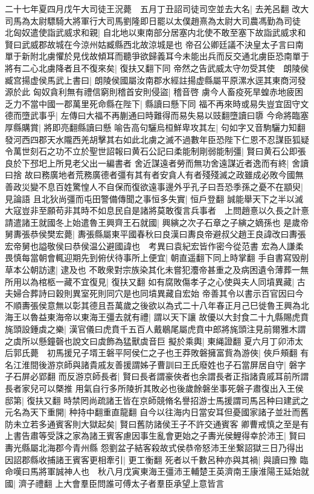 二十七年夏四月戊午大司徒王況薨　五月丁丑詔司徒司空並去大名|{
	去羌呂翻}
改大司馬為太尉驃騎大將軍行大司馬劉隆即日罷以太僕趙熹為太尉大司農馮勤為司徒　北匈奴遣使詣武威求和親|{
	自北地以東南部分居塞内北使不敢至塞下故詣武威求和賢曰武威郡故城在今涼州姑臧縣西北故涼城是也}
帝召公卿廷議不決皇太子言曰南單于新附北虜懼於見伐故傾耳而聽爭欲歸義耳今未能出兵而反交通北虜臣恐南單于將有二心北虜降者且不復來矣|{
	復扶又翻下同}
帝然之告武威太守勿受其使　朗陵侯臧宫揚虚侯馬武上書曰|{
	朗陵侯國屬汝南郡水經註揚虚縣屬平原漯水逕其東商河發源於此}
匈奴貪利無有禮信窮則稽首安則侵盜|{
	稽音啓}
虜今人畜疫死旱蝗赤地疲困乏力不當中國一郡萬里死命縣在陛下|{
	縣讀曰懸下同}
福不再來時或易失豈宜固守文德而墮武事乎|{
	左傳曰大福不再蒯通曰時難得而易失易以豉翻墮讀曰隳}
今命將臨塞厚縣購賞|{
	將即亮翻縣讀曰懸}
喻告高句驪烏桓鮮卑攻其左|{
	句如字又音駒驪力知翻}
發河西四郡天水隴西羌胡擊其右如此北虜之滅不過數年臣恐陛下仁恩不忍謀臣狐疑令萬世刻石之功不立於聖世詔報曰黄石公記曰柔能制剛弱能制彊|{
	賢曰黄石公即張良於下邳圯上所見老父出一編書者}
舍近謀遠者勞而無功舍遠謀近者逸而有終|{
	舍讀曰捨}
故曰務廣地者荒務廣德者彊有其有者安貪人有者殘殘滅之政雖成必敗今國無善政災變不息百姓驚惶人不自保而復欲遠事邊外乎孔子曰吾恐季孫之憂不在顓臾|{
	見論語}
且北狄尚彊而屯田警備傳聞之事恒多失實|{
	恒戶登翻}
誠能舉天下之半以滅大寇豈非至願苟非其時不如息民自是諸將莫敢復言兵事者　上問趙憙以久長之計憙請遣諸王就國冬上始遣魯王興齊王石就國|{
	興縯之次子石章之子縯之嫡孫也}
是歲帝舅夀張恭侯樊宏薨|{
	夀張縣屬東平國春秋曰良漢曰夀良帝避叔父趙王良諱改曰夀張宏帝舅也謚敬侯曰恭侯温公避國諱也　考異曰袁紀宏皆作密今從范書}
宏為人謙柔畏慎每當朝會輒迎期先到俯伏待事所上便宜|{
	朝直遥翻下同上時掌翻}
手自書寫毁削草本公朝訪逮|{
	逮及也}
不敢衆對宗族染其化未嘗犯灋帝甚重之及病困遺令薄葬一無所用以為棺柩一藏不宜復見|{
	復扶又翻}
如有腐敗傷孝子之心使與夫人同墳異藏|{
	古夫婦合葬詩曰穀則異室死則同穴是也同墳異藏自宏始}
帝善其令以書示百官因曰今不順夀張侯意無以彰其德且吾萬歲之後欲以為式二十八年春正月己巳徙魯王興為北海王以魯益東海帝以東海王彊去就有禮|{
	謂以天下讓}
故優以大封食二十九縣賜虎賁旄頭設鍾虡之樂|{
	漢官儀曰虎賁千五百人戴鶡尾屬虎賁中郎將旄頭注見前爾雅木謂之虡所以懸鐘磬也說文曰虡飾為猛獸虡音巨}
擬於乘輿|{
	東䋲證翻}
夏六月丁卯沛太后郭氏薨　初馬援兄子壻王磐平阿侯仁之子也王莽敗磐擁富貲為游俠|{
	俠戶頰翻}
有名江淮間後游京師與諸貴戚友善援謂姊子曹訓曰王氏廢姓也子石當屏居自守|{
	磐字子石屏必郢翻}
而反游京師長者|{
	賢曰長者謂豪俠者也余謂長者正指諸貴戚耳前所謂長者家兒可以槩推}
用氣自行多所陵折其敗必也後歲餘磐坐事死磐子肅復出入王侯邸第|{
	復扶又翻}
時禁罔尚疏諸王皆在京師競脩名譽招游士馬援謂司馬呂种曰建武之元名為天下重開|{
	种持中翻重直龍翻}
自今以往海内日當安耳但憂國家諸子並壯而舊防未立若多通賓客則大獄起矣|{
	賢曰舊防諸侯王子不許交通賓客}
卿曹戒慎之至是有上書告肅等受誅之家為諸王賓客慮因事生亂會更始之子夀光侯鯉得幸於沛王|{
	賢曰夀光縣屬北海郡今青州縣}
怨劉盆子結客殺故式侯恭帝怒沛王坐繋詔獄三日乃得出因詔郡縣收捕諸王賓客更相牽引|{
	更工衡翻}
死者以千數呂种亦與其禍|{
	與讀曰豫}
臨命嘆曰馬將軍誠神人也　秋八月戊寅東海王彊沛王輔楚王英濟南王康淮陽王延始就國|{
	濟子禮翻}
上大會羣臣問誰可傅太子者羣臣承望上意皆言

